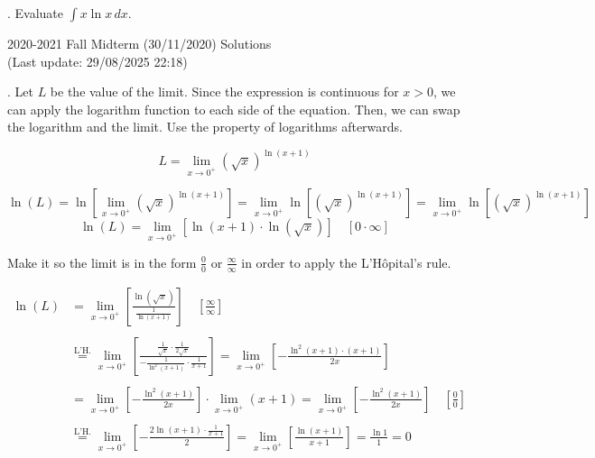 \documentclass{article}
\begin{document}
\hfill

. Evaluate $\displaystyle\int x\ln x\,dx$.

\hfill

\newpage

\begin{center}
2020-2021 Fall Midterm (30/11/2020) Solutions\\
(Last update: 29/08/2025 22:18)
\end{center}

. Let $L$ be the value of the limit. Since the expression is continuous for $x>0$, we can apply the logarithm function to each side of the equation. Then, we can swap the logarithm and the limit. Use the property of logarithms afterwards.

\[L=\lim_{x\to0^+}\left(\sqrt x\right)^{\ln\left(x+1\right)}\]

\[\ln(L)=\ln\left[\lim_{x\to0^+}\left(\sqrt x\right)^{\ln\left(x+1\right)}\right]=\lim_{x\to0^+}\ln\left[\left(\sqrt x\right)^{\ln\left(x+1\right)}\right]=\lim_{x\to0^+}\ln\left[\left(\sqrt x\right)^{\ln\left(x+1\right)}\right] \]
\[\ln\left(L\right)=\lim_{x\to0^+}\left[\ln\left(x+1\right)\cdot\ln\left(\sqrt x\right)\right] \quad\left[0\cdot\infty\right]\]

\hfill

\noindent Make it so the limit is in the form $\displaystyle \frac00$ or $\displaystyle \frac\infty\infty$ in order to apply the L'Hôpital's rule.

\begin{align*}\ln\left(L\right)&=\lim_{x\to0^+}\left[\frac{\ln\left(\sqrt x\right)}{\frac1{\ln\left(x+1\right)}}\right] \quad\left[\frac\infty\infty\right]\\\\&\overset{\text{L'H.}}{=}\lim_{x\to0^+}\left[\frac{\frac1{\sqrt x}\cdot\frac1{2\sqrt x}}{-\frac1{\ln^2\left(x+1\right)}\cdot \frac1{x+1}}\right]=\lim_{x\to0^+}\left[-\frac{\ln^2(x+1)\cdot(x+1)}{2x}\right]\\\\&=\lim_{x\to0^+}\left[-\frac{\ln^2(x+1)}{2x}\right] \cdot\lim_{x\to0^+} \left(x+1\right)=\lim_{x\to0^+}\left[-\frac{\ln^2(x+1)}{2x}\right]\quad\left[\frac00\right]\\\\&\overset{\text{L'H.}}{=}\lim_{x\to0^+}\left[-\frac{2\ln(x+1) \cdot\frac1{x+1}}2\right]=\lim_{x\to0^+}\left[\frac{\ln(x+1)}{x+1}\right]=\frac{\ln1}{1}=0\end{align*}
\end{document}
